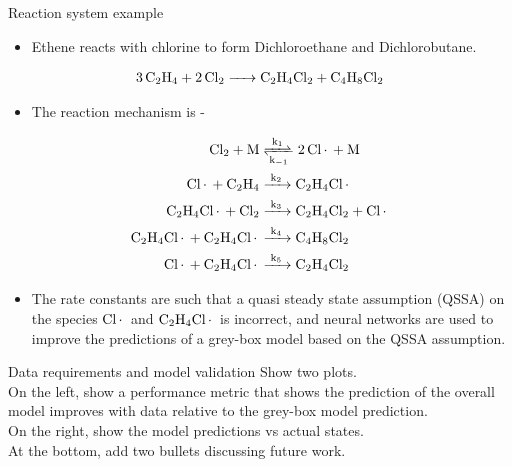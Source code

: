 \documentclass[xcolor=dvipsnames, 8pt]{beamer} %
\begin{document}
\begin{frame}{Reaction system example}
	\begin{itemize}
		\item Ethene reacts with chlorine to form Dichloroethane and Dichlorobutane.
	\end{itemize}
	\begin{align*}
		\ce{3C2H4 + 2Cl2 -> C2H4Cl2 + C4H8Cl2}
	\end{align*} 
	\begin{itemize}
		\item The reaction mechanism is -
	\end{itemize}
	\small{\begin{align*}
		\ce{Cl2 + M &<=>[k1][k_{-1}] 2Cl* + M}\\
		\ce{Cl* + C2H4 &->[k2] C2H4Cl*}\\
		\ce{C2H4Cl* + Cl2 &->[k3] C2H4Cl2 + Cl*}\\
		\ce{C2H4Cl* + C2H4Cl* &->[k4] C4H8Cl2}\\
		\ce{Cl* +  C2H4Cl* &->[k5] C2H4Cl2}
	\end{align*}}
\normalsize{\begin{itemize}
	\item The rate constants are such that a quasi steady state assumption (QSSA) on the species $\ce{Cl*}$ and $\ce{C2H4Cl*}$ is incorrect, and neural networks are used to improve the predictions of a  
	grey-box model based on the QSSA assumption.
\end{itemize}}
\end{frame}

\begin{frame}{Data requirements and model validation}
	Show two plots. \\
	On the left, show a performance metric
	that shows the prediction of the overall model improves with data
	relative to the grey-box model prediction. \\
	On the right, show the model predictions vs actual states. \\
	At the bottom, add two bullets discussing future work. \\
\end{frame}

%
%
\end{document}
